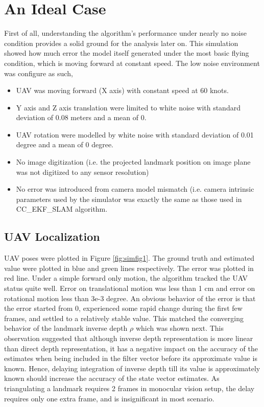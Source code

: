 \section{An Ideal Case}
First of all, understanding the algorithm's performance under nearly
no noise condition provides a solid ground for the analysis later on.
This simulation showed how much error the model itself generated under
the most basic flying condition, which is moving forward at constant
speed. The low noise environment was configure as such,

\begin{itemize}
  \item UAV was moving forward (X axis) with constant speed at 60 knots. 
  \item Y axis and Z axis translation were limited to white noise with
  standard deviation of 0.08 meters and a mean of 0.
  \item UAV rotation were modelled by white noise with standard
  deviation of 0.01 degree and a mean of 0 degree.
  \item No image digitization (i.e. the projected landmark position on
  image plane was not digitized to any sensor resolution)
  \item No error was introduced from camera model mismatch (i.e.
  camera intrinsic parameters used by the simulator was exactly the
  same as those used in CC\_EKF\_SLAM algorithm.
\end{itemize}

\subsection{UAV Localization}
UAV poses were plotted in Figure \ref{fig:simfig1}. The ground truth
and estimated value were plotted in blue and green lines respectively.
The error was plotted in red line. Under a simple forward only motion,
the algorithm tracked the UAV status quite well. Error on
translational motion was less than 1 cm and error on rotational motion
less than 3e-3 degree. An obvious behavior of the error is that the
error started from 0, experienced some rapid change during the first
few frames, and settled to a relatively stable value. This matched the
converging behavior of the landmark inverse depth $\rho$ which was
shown next. This observation suggested that although inverse depth
representation is more linear than direct depth representation, it has
a negative impact on the accuracy of the estimates when being included
in the filter vector before its approximate value is known. Hence,
delaying integration of inverse depth till its value is approximately
known should increase the accuracy of the state vector estimates. As
triangulating a landmark requires 2 frames in monocular vision setup,
the delay requires only one extra frame, and is insignificant in most
scenario.

